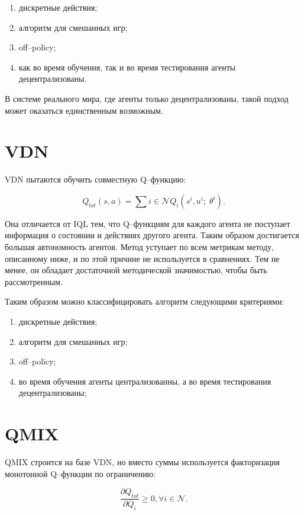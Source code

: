\begin{enumerate}[label={\arabic*)}]
	\item дискретные действия;
	\item алгоритм для смешанных игр;
	\item off--policy;
	\item как во время обучения, так и во время тестирования агенты децентрализованы.
\end{enumerate}

В системе реального мира, где агенты только децентрализованы, такой подход может оказаться единственным возможным.

\section{VDN}

VDN \cite{DBLP:journals/corr/SunehagLGCZJLSL17} пытаются обучить совместную Q--функцию:

\begin{equation}
	Q_{tot} (s, a) = \sum{i \in \mathcal{N}} Q_i(s^i, u^i; \; \theta^i).
\end{equation}

Она отличается от IQL тем, что Q--функциям для каждого агента не поступает информация о состоянии и действиях другого агента.
Таким образом достигается большая автономность агентов. Метод уступает по всем метрикам методу, описанному ниже, и по этой причине не используется в сравнениях. 
Тем не менее, он обладает достаточной методической значимостью, чтобы быть рассмотренным.

Таким образом можно классифицировать алгоритм следующими критериями: 
\begin{enumerate}[label={\arabic*)}]
	\item дискретные действия;
	\item алгоритм для смешанных игр;
	\item off--policy;
	\item во время обучения агенты централизованны, а во время тестирования децентрализованы;
\end{enumerate}

\section{QMIX}

QMIX строится на базе VDN, но вместо суммы используется факторизация монотонной Q--функции по ограничению:

\begin{equation}
	\frac{\partial Q_{tot}}{\partial Q_i} \geq 0,\forall i \in \mathcal{N}.
\end{equation}

